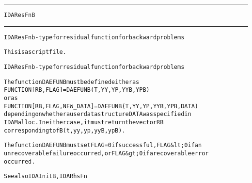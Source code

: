 \begin{samepage}
\hrule
\begin{center}
{\large \verb!IDAResFnB!}
\label{p:IDAResFnB}
\end{center}
\hrule\vspace{0.1in}



\begin{alltt}
IDAResFnb - type for residual function for backward problems
\end{alltt}

\end{samepage}



\begin{samepage}


\begin{alltt}
This is a script file. 
\end{alltt}

\end{samepage}



\begin{alltt}
IDAResFnb - type for residual function for backward problems

   The function DAEFUNB must be defined either as
        FUNCTION [RB, FLAG] = DAEFUNB(T, YY, YP, YYB, YPB)
   or as
        FUNCTION [RB, FLAG, NEW_DATA] = DAEFUNB(T, YY, YP, YYB, YPB, DATA)
   depending on whether a user data structure DATA was specified in
   IDAMalloc. In either case, it must return the vector RB
   corresponding to fB(t,yy,yp,yyB,ypB).

   The function DAEFUNB must set FLAG=0 if successful, FLAG&lt;0 if an
   unrecoverable failure occurred, or FLAG&gt;0 if a recoverable error
   occurred.

   See also IDAInitB, IDARhsFn
\end{alltt}






\vspace{0.1in}